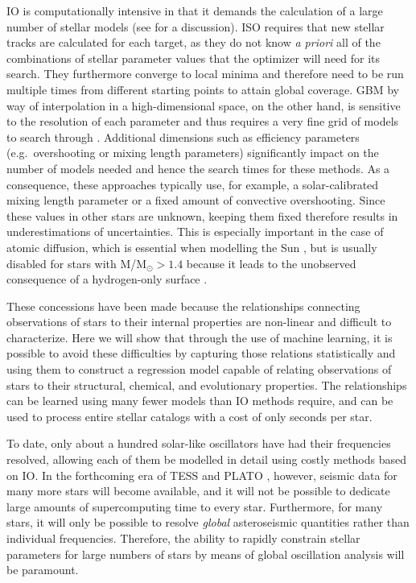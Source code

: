 \documentclass[manuscript,linenumbers]{aastex6}
\newif\ifref
\newcommand{\mb}[1]{\ifref\boldmath\textbf{#1}\unboldmath\else #1\fi}
\begin{document}
IO is computationally intensive in that it demands the calculation of a large number of stellar models (see \citealt{2009ApJ...699..373M} for a discussion). ISO requires that new stellar tracks are calculated for each target, as they do not know \emph{a priori} all of the combinations of stellar parameter values that the optimizer will need for its search. They furthermore converge to local minima and therefore need to be run multiple times from different starting points to attain global coverage. GBM by way of interpolation in a high-dimensional space, on the other hand, is sensitive to the resolution of each parameter and thus requires a very fine grid of models to search through \citep[see e.g.][who use more than five million models that were varied in just four initial parameters]{2010ApJ...725.2176Q}. Additional dimensions such as efficiency parameters (e.g.\ overshooting or mixing length parameters) significantly impact on the number of models needed and hence the search times for these methods. As a consequence, these approaches typically use, for example, a solar-calibrated mixing length parameter or a fixed amount of convective overshooting. Since these values in other stars are unknown, keeping them fixed therefore results in underestimations of uncertainties. This is especially important in the case of atomic diffusion, which is essential when modelling the Sun \citep[see e.g.][]{1994MNRAS.269.1137B}, but is usually disabled for stars with M/M$_\odot > 1.4$ because it leads to the unobserved consequence of a hydrogen-only surface \citep{2002AA...390..611M}. 

These concessions have been made because the relationships connecting \mb{observations} of stars to their internal \mb{properties} are non-linear and difficult to characterize. Here we will show that through the use of machine learning, it is possible to avoid these difficulties by capturing those relations statistically and using them to construct a regression model capable of relating observations of stars to their structural, chemical, and evolutionary properties. The relationships can be learned using many fewer models than IO methods require, and can be used to process entire stellar catalogs with a cost of only seconds per star. 

To date, only about a hundred solar-like oscillators have had their frequencies resolved, allowing each of them be modelled in detail using costly methods based on IO. In the forthcoming era of TESS \citep{2015JATIS...1a4003R} and PLATO \citep{2014ExA....38..249R}, however, seismic data for many more stars will become available, and it will not be possible to dedicate large amounts of supercomputing time to every star. Furthermore, for many stars, it will only be possible to resolve \emph{global} asteroseismic quantities rather than individual frequencies. Therefore, the ability to rapidly constrain stellar parameters for large numbers of stars by means of global oscillation analysis will be paramount. 
\end{document}
